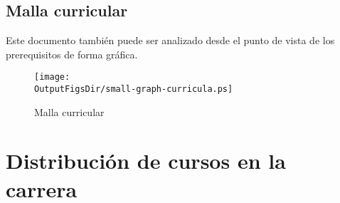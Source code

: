 % 

\begin{landscape}

\end{landscape}

\begin{landscape}
\section{Malla curricular}\label{sec:vision-grafica}
\vspace{-0.3cm}Este documento también puede ser analizado desde el punto de vista de los prerequisitos de forma gráfica.
\begin{figure}[h!]
      \texttt{[image: \\OutputFigsDir/small-graph-curricula.ps]}
      \label{fig:malla-curricular}
      \caption{Malla curricular \SchoolFullName}
\end{figure}
\end{landscape}

\section{Distribución de cursos en la carrera}

% 
% 
% 
% 
